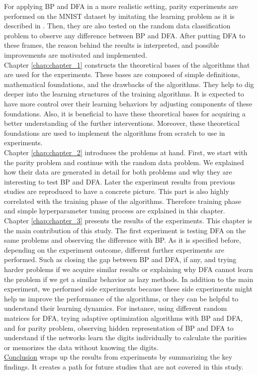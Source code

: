 \documentclass[a4paper, nobind]{templates/ociamthesis}
\begin{document}
For applying BP and DFA in a more realistic setting, parity experiments are performed on the MNIST dataset by imitating the learning problem as it is described in \cite{DBLP:journals/corr/abs-2002-07400}. Then, they are also tested on the random data classification problem to observe any difference between BP and DFA. After putting DFA to these frames, the reason behind the results is interpreted, and possible improvements are motivated and implemented.\\
Chapter \ref{chap:chapter_1} constructs the theoretical bases of the algorithms that are used for the experiments. These bases are composed of simple definitions, mathematical foundations, and the drawbacks of the algorithms. They help to dig deeper into the learning structures of the training algorithms. It is expected to have more control over their learning behaviors by adjusting components of these foundations. Also, it is beneficial to have these theoretical bases for acquiring a better understanding of the further interventions. Moreover, these theoretical foundations are used to implement the algorithms from scratch to use in experiments.\\
Chapter \ref{chap:chapter_2} introduces the problems at hand. First, we start with the parity problem and continue with the random data problem. We explained how their data are generated in detail for both problems and why they are interesting to test BP and DFA. Later the experiment results from previous studies \cite{DBLP:journals/corr/abs-2002-07400, chizat2020implicit} are reproduced to have a concrete picture. This part is also highly correlated with the training phase of the algorithms. Therefore training phase and simple hyperparameter tuning process are explained in this chapter.\\
Chapter \ref{chap:chapter_3} presents the results of the experiments. This chapter is the main contribution of this study. The first experiment is testing DFA on the same problems and observing the difference with BP. As it is specified before, depending on the experiment outcome, different further experiments are performed. Such as closing the gap between BP and DFA, if any, and trying harder problems if we acquire similar results or explaining why DFA cannot learn the problem if we get a similar behavior as lazy methods. In addition to the main experiment, we performed side experiments because these side experiments might help us improve the performance of the algorithms, or they can be helpful to understand their learning dynamics. For instance, using different random matrices for DFA, trying adaptive optimization algorithms with BP and DFA, and for parity problem, observing hidden representation of BP and DFA to understand if the networks learn the digits individually to calculate the parities or memorizes the data without knowing the digits.\\
\protect\hyperlink{chap:conc}{Conclusion} wraps up the results from experiments by summarizing the key findings. It creates a path for future studies that are not covered in this study.
\end{document}
